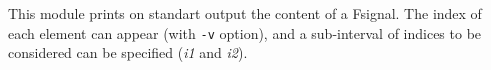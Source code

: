 This module prints on standart output the content of a Fsignal.
The index of each element can appear (with \verb+-v+ option), and
a sub-interval of indices to be considered can be specified
({\it i1} and {\it i2}).
